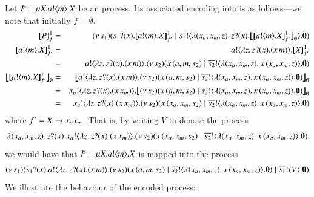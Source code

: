 \documentclass[runningheads]{llncs}
\begin{document}
{%
\begin{example}
Let $P = \mu X. a ! \langle m \rangle . X$ be an \HOp process.
Its associated encoding into \HO is as follows---we note that initially $f = \emptyset$.
\begin{eqnarray*}
	\pmapp{P}{1}{f} &=&
	\newsp{s_1}{ \binp{s_1}{x} \pmapp{\bout{a}{m} \varp{X}}{1}{{f'}} \Par \bout{\dual{s_1}}{ \abs{(x_a, x_m, z)} \binp{z}{x} \auxmapp{\pmapp{\bout{a}{m} \varp{X}}{1}{{f'}}}{{}}{\es} } \inact} \\
\pmapp{\bout{a}{m} \varp{X}}{1}{{ f'}} &=&
	\bout{a}{\abs{z}{\binp{z}{x} (\appl{x}{m})}} \pmapp{\varp{X}}{1}{{f'}}
	\\
	&=& \bout{a}{\abs{z}{\binp{z}{x} (\appl{x}{m})}} \newsp{s_2}{\appl{x}{(a,m, s_2)}  \Par \bout{\dual{s_2}}{\abs{(x_a, x_m, z)}{\appl{x}{(x_a, x_m, z)}}} \inact} \\
	\auxmapp{\pmapp{\bout{a}{m} \varp{X}}{1}{{f'}}}{{}}{\es}
	  & = & \auxmapp{\bout{a}{\abs{z}{\binp{z}{x} (\appl{x}{m})}} \newsp{s_2}{\appl{x}{(a,m, s_2)}  \Par \bout{\dual{s_2}}{\abs{(x_a, x_m, z)}{\appl{x}{(x_a, x_m, z)}}} \inact}}{{}}{\es}
	\\
	 & = & \bout{x_a}{\abs{z}{\binp{z}{x} (\appl{x}{x_m})}} \auxmapp{\newsp{s_2}{\appl{x}{(a,m, s_2)}  \Par \bout{\dual{s_2}}{\abs{(x_a, x_m, z)}{\appl{x}{(x_a, x_m, z)}}} \inact}}{{}}{\es}
	\\
	& = & \bout{x_a}{\abs{z}{\binp{z}{x} (\appl{x}{x_m})}} \newsp{s_2}{\appl{x}{(x_a,x_m, s_2)}  \Par \bout{\dual{s_2}}{\abs{(x_a, x_m, z)}{\appl{x}{(x_a, x_m, z)}}} \inact}
\end{eqnarray*}
where $f' = X \rightarrow x_ax_m$.
That is, by writing $V$ to denote the process
$$
\lambda (x_a, x_m, z).\,z ? (x) . x_a ! \langle \lambda z.\,z ? (x) . (x\, {x_m}) \rangle . (\nu\, s_2)(x\, {(x_a,x_m, s_2)}  \;|\; \overline{s_2} ! \langle \lambda (x_a, x_m, z).\,x\, {(x_a, x_m, z)} \rangle . \mathbf{0})
$$
we would have that $P = \mu X. a ! \langle m \rangle . X$ is mapped into the \HO process
$$
(\nu\, s_1)(s_1 ? (x) .  a ! \langle \lambda z.\,z ? (x) . (x\, {m}) \rangle . (\nu\, s_2)(x\, {(a,m, s_2)}  \;|\; \overline{s_2} ! \langle \lambda (x_a, x_m, z).\,x\, {(x_a, x_m, z)} \rangle . \mathbf{0})\;|\; \overline{s_1} ! \langle V \rangle . \mathbf{0})
$$
We illustrate the behaviour of the encoded process:

\end{example}}
\end{document}
